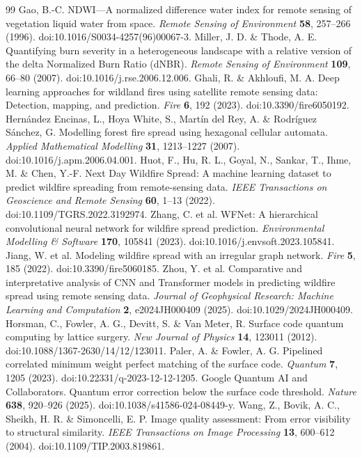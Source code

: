 \documentclass[fleqn,10pt]{wlscirep}
\begin{document}
\begin{thebibliography}{99}
 Gao, B.-C. NDWI---A normalized difference water index for remote sensing of vegetation liquid water from space. \textit{Remote Sensing of Environment} \textbf{58}, 257--266 (1996). doi:10.1016/S0034-4257(96)00067-3.
 Miller, J. D. \& Thode, A. E. Quantifying burn severity in a heterogeneous landscape with a relative version of the delta Normalized Burn Ratio (dNBR). \textit{Remote Sensing of Environment} \textbf{109}, 66--80 (2007). doi:10.1016/j.rse.2006.12.006.
 Ghali, R. \& Akhloufi, M. A. Deep learning approaches for wildland fires using satellite remote sensing data: Detection, mapping, and prediction. \textit{Fire} \textbf{6}, 192 (2023). doi:10.3390/fire6050192.
 Hern\'andez Encinas, L., Hoya White, S., Mart\'in del Rey, A. \& Rodr\'iguez S\'anchez, G. Modelling forest fire spread using hexagonal cellular automata. \textit{Applied Mathematical Modelling} \textbf{31}, 1213--1227 (2007). doi:10.1016/j.apm.2006.04.001.
 Huot, F., Hu, R. L., Goyal, N., Sankar, T., Ihme, M. \& Chen, Y.-F. Next Day Wildfire Spread: A machine learning dataset to predict wildfire spreading from remote-sensing data. \textit{IEEE Transactions on Geoscience and Remote Sensing} \textbf{60}, 1--13 (2022). doi:10.1109/TGRS.2022.3192974.
 Zhang, C. et al. WFNet: A hierarchical convolutional neural network for wildfire spread prediction. \textit{Environmental Modelling \& Software} \textbf{170}, 105841 (2023). doi:10.1016/j.envsoft.2023.105841.
 Jiang, W. et al. Modeling wildfire spread with an irregular graph network. \textit{Fire} \textbf{5}, 185 (2022). doi:10.3390/fire5060185.
 Zhou, Y. et al. Comparative and interpretative analysis of CNN and Transformer models in predicting wildfire spread using remote sensing data. \textit{Journal of Geophysical Research: Machine Learning and Computation} \textbf{2}, e2024JH000409 (2025). doi:10.1029/2024JH000409.
 Horsman, C., Fowler, A. G., Devitt, S. \& Van Meter, R. Surface code quantum computing by lattice surgery. \textit{New Journal of Physics} \textbf{14}, 123011 (2012). doi:10.1088/1367-2630/14/12/123011.
 Paler, A. \& Fowler, A. G. Pipelined correlated minimum weight perfect matching of the surface code. \textit{Quantum} \textbf{7}, 1205 (2023). doi:10.22331/q-2023-12-12-1205.
 Google Quantum AI and Collaborators. Quantum error correction below the surface code threshold. \textit{Nature} \textbf{638}, 920--926 (2025). doi:10.1038/s41586-024-08449-y.
 Wang, Z., Bovik, A. C., Sheikh, H. R. \& Simoncelli, E. P. Image quality assessment: From error visibility to structural similarity. \textit{IEEE Transactions on Image Processing} \textbf{13}, 600--612 (2004). doi:10.1109/TIP.2003.819861.
\end{thebibliography}
\end{document}
